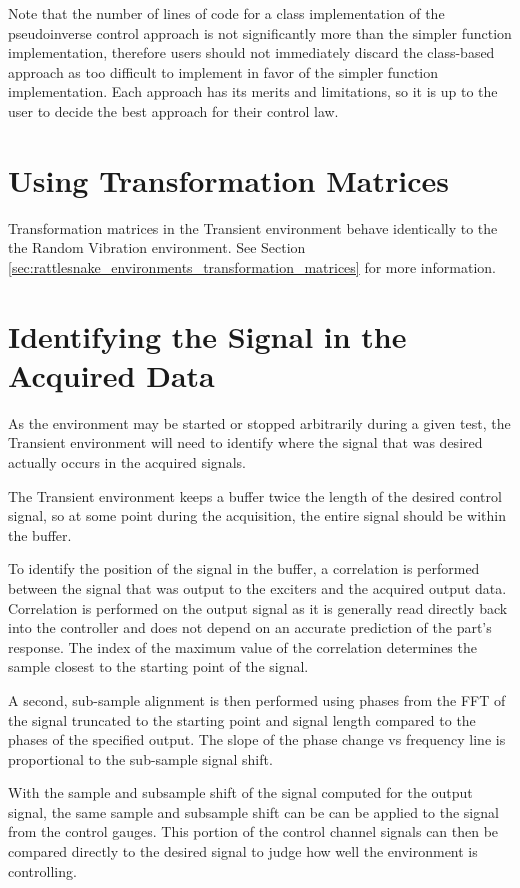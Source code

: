\documentclass[pdf,12pt,report]{SANDreport}
\begin{document}
    Note that the number of lines of code for a class implementation of the pseudoinverse control approach is not significantly more than the simpler function implementation, therefore users should not immediately discard the class-based approach as too difficult to implement in favor of the simpler function implementation.  Each approach has its merits and limitations, so it is up to the user to decide the best approach for their control law.
    
    \section{Using Transformation Matrices}
    Transformation matrices in the Transient environment behave identically to the the Random Vibration environment.  See Section \ref{sec:rattlesnake_environments_transformation_matrices} for more information.
    
    \section{Identifying the Signal in the Acquired Data}
    As the environment may be started or stopped arbitrarily during a given test, the Transient environment will need to identify where the signal that was desired actually occurs in the acquired signals.
    
    The Transient environment keeps a buffer twice the length of the desired control signal, so at some point during the acquisition, the entire signal should be within the buffer.
    
    To identify the position of the signal in the buffer, a correlation is performed between the signal that was output to the exciters and the acquired output data.  Correlation is performed on the output signal as it is generally read directly back into the controller and does not depend on an accurate prediction of the part's response.  The index of the maximum value of the correlation determines the sample closest to the starting point of the signal.
    
    A second, sub-sample alignment is then performed using phases from the \ac{FFT} of the signal truncated to the starting point and signal length compared to the phases of the specified output.  The slope of the phase change vs frequency line is proportional to the sub-sample signal shift.
    
    With the sample and subsample shift of the signal computed for the output signal, the same sample and subsample shift can be can be applied to the signal from the control gauges.  This portion of the control channel signals can then be compared directly to the desired signal to judge how well the environment is controlling.
\end{document}
